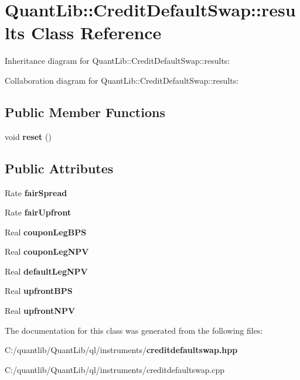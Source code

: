 \section{Quant\+Lib\+:\+:Credit\+Default\+Swap\+:\+:results Class Reference}
\label{class_quant_lib_1_1_credit_default_swap_1_1results}


Inheritance diagram for Quant\+Lib\+:\+:Credit\+Default\+Swap\+:\+:results\+:


Collaboration diagram for Quant\+Lib\+:\+:Credit\+Default\+Swap\+:\+:results\+:
\subsection*{Public Member Functions}
\begin{DoxyCompactItemize}
\item 
void {\bfseries reset} ()\label{class_quant_lib_1_1_credit_default_swap_1_1results_a6d24539941463fc824a5512464ec5088}

\end{DoxyCompactItemize}
\subsection*{Public Attributes}
\begin{DoxyCompactItemize}
\item 
Rate {\bfseries fair\+Spread}\label{class_quant_lib_1_1_credit_default_swap_1_1results_afa9464db59270aaf20788a3110838263}

\item 
Rate {\bfseries fair\+Upfront}\label{class_quant_lib_1_1_credit_default_swap_1_1results_a1fc85bebca5e9a1d313e7b466dbd005c}

\item 
Real {\bfseries coupon\+Leg\+B\+PS}\label{class_quant_lib_1_1_credit_default_swap_1_1results_ae5eea8b02c684c08293b13eb6ba205f2}

\item 
Real {\bfseries coupon\+Leg\+N\+PV}\label{class_quant_lib_1_1_credit_default_swap_1_1results_ab4cfc22426e3a5d0e54e495fd1f911b8}

\item 
Real {\bfseries default\+Leg\+N\+PV}\label{class_quant_lib_1_1_credit_default_swap_1_1results_a469172f5bd521ae95b67699cd76a3168}

\item 
Real {\bfseries upfront\+B\+PS}\label{class_quant_lib_1_1_credit_default_swap_1_1results_a3a81ac142cc00eeaa4301510e863d3f6}

\item 
Real {\bfseries upfront\+N\+PV}\label{class_quant_lib_1_1_credit_default_swap_1_1results_a688ca821e77960f2e64ff88212e9e6c6}

\end{DoxyCompactItemize}


The documentation for this class was generated from the following files\+:\begin{DoxyCompactItemize}
\item 
C\+:/quantlib/\+Quant\+Lib/ql/instruments/{\bf creditdefaultswap.\+hpp}\item 
C\+:/quantlib/\+Quant\+Lib/ql/instruments/creditdefaultswap.\+cpp\end{DoxyCompactItemize}
